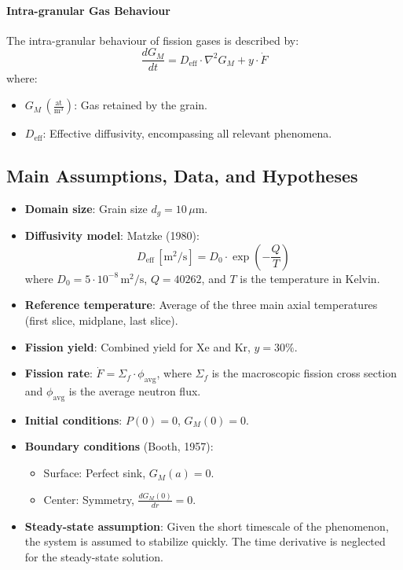 \paragraph{Intra-granular Gas Behaviour}
The intra-granular behaviour of fission gases is described by:
\begin{equation}
    \frac{dG_M}{dt} = D_{\text{eff}} \cdot \nabla^2 G_M + y \cdot \dot{F}
\end{equation}
where:
\begin{itemize}
    \item $G_M \, \left(\frac{\text{at}}{\text{m}^3}\right)$: Gas retained by the grain.
    \item $D_{\text{eff}}$: Effective diffusivity, encompassing all relevant phenomena.
\end{itemize}

\subsection{Main Assumptions, Data, and Hypotheses}

\begin{itemize}
    \item \textbf{Domain size}: Grain size $d_g = 10\,\mu \text{m}$.
    \item \textbf{Diffusivity model}: Matzke (1980):
    \begin{equation}
        D_{\text{eff}} \, [\text{m}^2/\text{s}] = D_0 \cdot \exp\left(-\frac{Q}{T}\right)
    \end{equation}
    where $D_0 = 5 \cdot 10^{-8} \, \text{m}^2/\text{s}$, $Q = 40262$, and $T$ is the temperature in Kelvin.
    \item \textbf{Reference temperature}: Average of the three main axial temperatures (first slice, midplane, last slice).
    \item \textbf{Fission yield}: Combined yield for Xe and Kr, $y = 30\%$.
    \item \textbf{Fission rate}: $\dot{F} = \Sigma_f \cdot \phi_{\text{avg}}$, where $\Sigma_f$ is the macroscopic fission cross section and $\phi_{\text{avg}}$ is the average neutron flux.
    \item \textbf{Initial conditions}: $P(0) = 0$, $G_M(0) = 0$.
    \item \textbf{Boundary conditions} (Booth, 1957):
    \begin{itemize}
        \item Surface: Perfect sink, $G_M(a) = 0$.
        \item Center: Symmetry, $\frac{dG_M(0)}{dr} = 0$.
    \end{itemize}
    \item \textbf{Steady-state assumption}: Given the short timescale of the phenomenon, the system is assumed to stabilize quickly. The time derivative is neglected for the steady-state solution.
\end{itemize}

